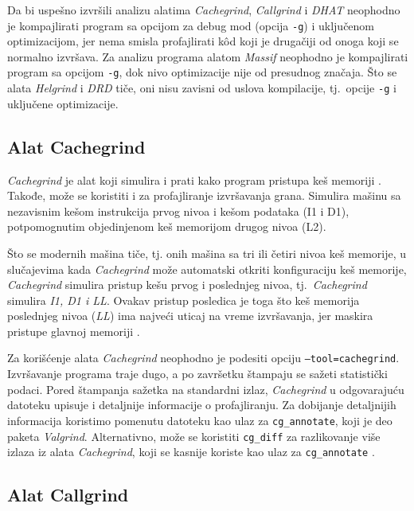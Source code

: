 \documentclass[12pt,oneside]{memoir}
\theoremstyle{plain}
\theoremstyle{definition}
\begin{document}
Da bi uspešno izvršili analizu alatima \textit{Cachegrind}, \textit{Callgrind} i \textit{DHAT} neophodno je kompajlirati program sa opcijom za debug mod (opcija \texttt{-g}) i uključenom optimizacijom, jer nema smisla profajlirati k\^od koji je drugačiji od onoga koji se normalno izvršava. Za analizu programa alatom \textit{Massif} neophodno je kompajlirati program sa opcijom \texttt{-g}, dok nivo optimizacije nije od presudnog značaja. Što se alata \textit{Helgrind} i \textit{DRD} tiče, oni nisu zavisni od uslova kompilacije, tj.~opcije \texttt{-g} i uključene optimizacije.

\subsection{Alat Cachegrind}
\textit{Cachegrind} je alat koji simulira i prati kako program pristupa keš memoriji \cite{Cachegrind}. Takođe, može se koristiti i za profajliranje izvršavanja grana. Simulira mašinu sa nezavisnim kešom instrukcija prvog nivoa i kešom podataka (I1 i D1), potpomognutim objedinjenom keš memorijom drugog nivoa (L2). 

Što se modernih mašina tiče, tj. onih mašina sa tri ili četiri nivoa keš memorije, u slučajevima kada \textit{Cachegrind} može automatski otkriti konfiguraciju keš memorije, \textit{Cachegrind} simulira pristup kešu prvog i poslednjeg nivoa, tj.~\textit{Cachegrind} simulira \textit{I1, D1 i LL}. Ovakav pristup posledica je toga što keš memorija poslednjeg nivoa (\textit{LL}) ima najveći uticaj na vreme izvršavanja, jer maskira pristupe glavnoj memoriji \cite{Cachegrind}.%

Za korišćenje alata \textit{Cachegrind} neophodno je podesiti opciju \texttt{–tool=cachegrind}. Izvršavanje programa traje dugo, a po završetku štampaju se sažeti statistički podaci. Pored štampanja sažetka na standardni izlaz, \textit{Cachegrind} u odgovarajuću datoteku upisuje i detaljnije informacije o profajliranju. Za dobijanje detaljnijih informacija koristimo pomenutu datoteku kao ulaz za \texttt{cg\_annotate}, koji je deo paketa \textit{Valgrind}. Alternativno, može se koristiti \texttt{cg\_diff} za razlikovanje više izlaza iz alata \textit{Cachegrind}, koji se kasnije koriste kao ulaz za \texttt{cg\_annotate} \cite{Cachegrind}.

\subsection{Alat Callgrind}
\end{document}
